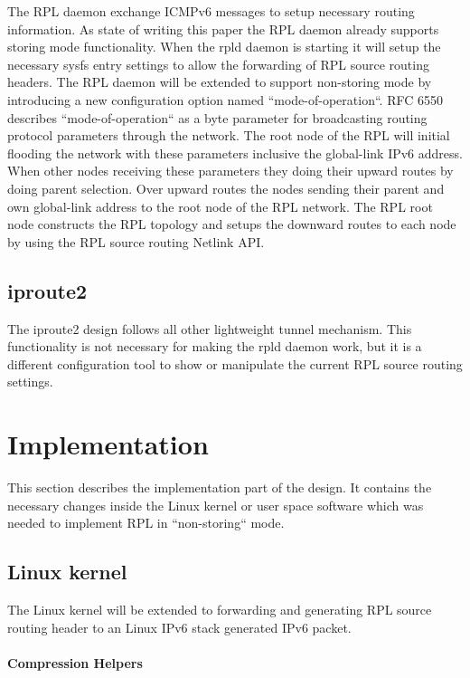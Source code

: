 \documentclass[letterpaper]{article}
\begin{document}
The RPL daemon exchange ICMPv6 messages to setup necessary routing information.
As state of writing this paper the RPL daemon already supports storing mode functionality.
When the rpld daemon is starting it will setup the necessary sysfs entry settings to allow the forwarding of RPL source routing headers.
The RPL daemon will be extended to support non-storing mode by introducing a new configuration option named ``mode-of-operation``.
RFC 6550 describes ``mode-of-operation`` as a byte parameter for broadcasting routing protocol parameters through the network.
The root node of the RPL will initial flooding the network with these parameters inclusive the global-link IPv6 address.
When other nodes receiving these parameters they doing their upward routes by doing parent selection.
Over upward routes the nodes sending their parent and own global-link address to the root node of the RPL network.
The RPL root node constructs the RPL topology and setups the downward routes to each node by using the RPL source routing Netlink API.

\subsection{iproute2}

The iproute2 design follows all other lightweight tunnel mechanism.
This functionality is not necessary for making the rpld daemon work, but it is a different configuration tool to show or manipulate the current RPL source routing settings.

\section{Implementation}

This section describes the implementation part of the design. It contains the necessary changes inside the Linux kernel or user space software which was needed to implement RPL in ``non-storing`` mode.

\subsection{Linux kernel}

The Linux kernel will be extended to forwarding and generating RPL source routing header to an Linux IPv6 stack generated IPv6 packet.

\paragraph{Compression Helpers}
\end{document}
